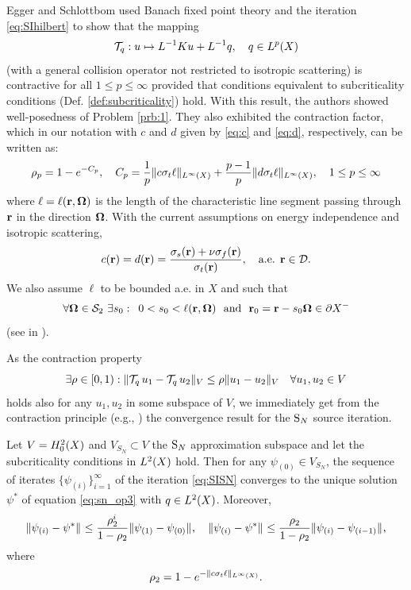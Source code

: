 Egger and Schlottbom \cite{Egger} used Banach fixed point theory and the iteration \eqref{eq:SIhilbert} to show that the 
mapping $$ \mathcal{T}_q : u \mapsto L^{-1}K u + L^{-1} q, \quad q \in \Lp(X)$$ (with a general collision operator not
restricted to isotropic scattering) is contractive for all $1 \leq p \leq \infty$ provided that conditions equivalent to
subcriticality conditions (Def. \ref{def:subcriticality}) hold. With this result, the authors showed well-posedness of Problem
\ref{prb:1}. 
They also exhibited the contraction factor, which in our notation with $c$ and $d$ given by \eqref{eq:c} and
\eqref{eq:d}, respectively, can be written as:
\begin{equation}\label{eq:contraction_factor}
	\rho_p = 1 - e^{-C_p}, \quad C_p = \frac{1}{p}\norm[{\Lp[\infty](X)}]{c\sigma_t\ell} +
	\frac{p-1}{p}\norm[{\Lp[\infty](X)}]{d\sigma_t\ell}, \quad 1 \leq p \leq \infty
\end{equation}
where $\ell = \ell(\br,\bomega)$ is the length of the characteristic line segment passing through $\br$ in the
direction $\bomega$. With the current assumptions on energy independence and isotropic scattering,
$$
	c(\br) = d(\br) = \frac{\sigma_s(\br) + \nu\sigma_f(\br)}{\sigma_t(\br)},\quad \text{a.e. } \br\in\VV.
$$
We also assume $\ell$ to be bounded a.e.
in $X$ and such that $$
	\forall \bomega \in \Sphere\ \exists s_0:\ \, 0 < s_0 < \ell(\br,\bomega)\ \mbox{ and }\ \br_0 = \br - s_0 \bomega \in
	\pX[-]
$$
(see  in ). 

As the contraction property
$$
\exists \rho \in [0, 1): \norm[V]{\mathcal{T}_q\, u_1 - \mathcal{T}_q\, u_2} \leq \rho \norm[V]{u_1 - u_2}\quad
\forall u_1,u_2 \in V $$
holds also for any $u_1,u_2$ in some subspace of $V$, we immediately get from the
contraction principle (e.g., \cite[Thm.
2.3.1]{DrabekNFA}) the convergence result for the $\SN$ source iteration. 
\begin{theorem}\label{thm:3}
	Let $V = \Hpnot[2](X)$ and $V_{S_N} \subset V$ the $\SN$ approximation subspace and let the subcriticality conditions
	in $\Lp[2](X)$ hold. 
	Then for any $\psi_{(0)} \in V_{S_N}$, the sequence of iterates $\{\psi_{(i)}\}_{i=1}^{\infty}$ of
	the iteration \eqref{eq:SISN} converges to the unique solution $\psi^*$ of equation \eqref{eq:sn_op3} with $q \in
	\Lp[2](X)$.
	Moreover, 
	$$
		\norm{\psi_{(i)} - \psi^*} \leq \frac{\rho_2^{i}}{1-\rho_2} \norm{\psi_{(1)} - \psi_{(0)}},\quad
		\norm{\psi_{(i)} - \psi^*} \leq \frac{\rho_2}{1-\rho_2} \norm{\psi_{(i)} - \psi_{(i-1)}},
	$$
	where 
	\begin{equation}\label{eq:rho2}
		\rho_2 = 1 - e^{-\norm[{\Lp[\infty](X)}]{c\sigma_t\ell}}.
\end{equation}
\end{theorem}

